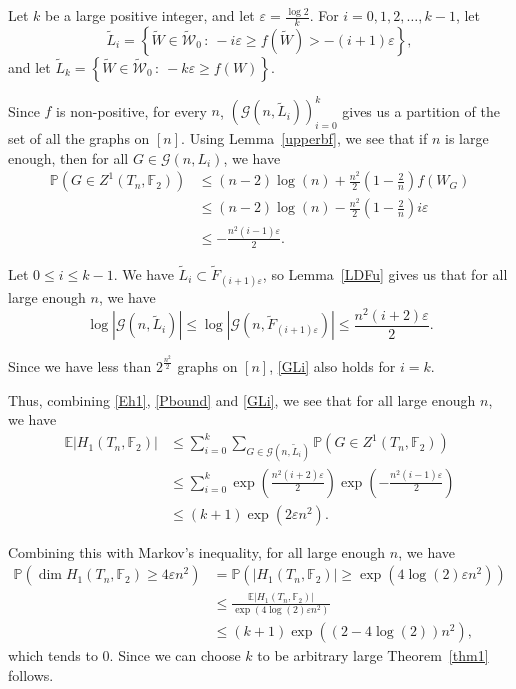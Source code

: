\documentclass[11pt,a4paper]{article}
\theoremstyle{plain}
\theoremstyle{definition}
\begin{document}
Let $k$ be a large positive integer, and let $\varepsilon=\frac{\log 2}k$. For $i=0,1,2,\dots,k-1$, let
\[\widetilde{L}_i=\left\{\widetilde{W}\in \widetilde{\mathcal{W}}_0\,:\: -i\varepsilon \ge f(\widetilde{W})>-(i+1)\varepsilon \right\},\]
and let $\widetilde{L}_{k}=\left\{\widetilde{W}\in \widetilde{\mathcal{W}}_0\,:\: -k\varepsilon \ge f(W) \right\}$. 

Since $f$ is non-positive, for every $n$, $(\mathcal{G}(n,\widetilde{L}_i))_{i=0}^{k}$ gives us a partition of the set of all the graphs on $[n]$. Using Lemma~\ref{upperbf}, we see that if $n$ is large enough, then for all $G\in \mathcal{G}(n,L_i)$, we have
\begin{align}\label{Pbound}\mathbb{P}\left(G\in Z^1(T_n,\mathbb{F}_2)\right)&\le  (n-2)\log (n)+\frac{n^2}2\left(1-\frac{2}n\right)f(W_G)\\&\le(n-2)\log (n)-\frac{n^2}2\left(1-\frac{2}n\right)i\varepsilon\nonumber\\&\le -\frac{n^2(i-1)\varepsilon}2. \nonumber
\end{align}

Let $0\le i\le k-1$. We have $\widetilde{L}_i\subset \widetilde{F}_{(i+1)\varepsilon}$, so Lemma~\ref{LDFu} gives us that for all large enough $n$, we have
\begin{equation}\label{GLi}\log |\mathcal{G}(n,\widetilde{L}_i)|\le \log |\mathcal{G}(n,\widetilde{F}_{(i+1)\varepsilon})|\le \frac{n^2(i+2)\varepsilon}2.
\end{equation}

Since we have less than $2^{\frac{n^2}2}$ graphs on $[n]$, \eqref{GLi} also holds for $i=k$. 

Thus, combining \eqref{Eh1}, \eqref{Pbound} and \eqref{GLi}, we see that for all large enough $n$, we have
\begin{align*}\mathbb{E} |H_1(T_n,\mathbb{F}_2)|&\le\sum_{i=0}^k \sum_{G\in \mathcal{G}(n,\widetilde{L}_i)}\mathbb{P}\left(G\in Z^1(T_n,\mathbb{F}_2)\right)\\&\le \sum_{i=0}^k \exp\left(\frac{n^2(i+2)\varepsilon}2\right)\exp\left(-\frac{n^2(i-1)\varepsilon}2\right)\\&\le (k+1)\exp\left(2\varepsilon n^2 \right).
\end{align*}

Combining this with Markov's inequality, for all large enough $n$, we have
\begin{align*}\mathbb{P}(\dim H_1(T_n,\mathbb{F}_2)\ge 4\varepsilon n^2)&=\mathbb{P}(| H_1(T_n,\mathbb{F}_2)|\ge \exp(4\log(2)\varepsilon n^2))\\&\le \frac{\mathbb{E} |H_1(T_n,\mathbb{F}_2)|}{\exp(4\log(2)\varepsilon n^2)}\\&\le (k+1)\exp((2-4\log(2))n^2), \end{align*}
which tends to $0$. Since we can choose $k$ to be arbitrary large Theorem~\ref{thm1} follows.
\end{document}
